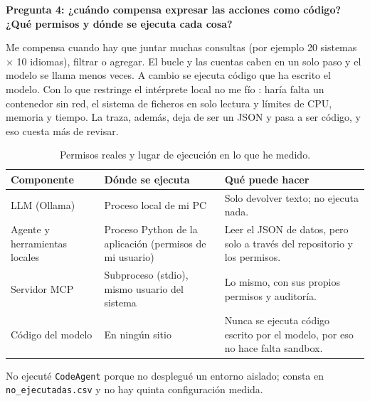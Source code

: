 \documentclass[10pt,a4paper]{article}
\newcommand{\cod}[1]{\texttt{\small #1}}
\newcommand{\pregunta}[1]{\par\medskip\noindent\colorbox{azul!10}{\parbox{\dimexpr\linewidth-2\fboxsep}{\textbf{#1}}}\par\smallskip}
\begin{document}
\pregunta{Pregunta 4: ¿cuándo compensa expresar las acciones como código? ¿Qué permisos y dónde se ejecuta cada cosa?}
Me compensa cuando hay que juntar muchas consultas (por ejemplo 20 sistemas $\times$ 10 idiomas), filtrar o agregar. El bucle y las cuentas caben en un solo paso y el modelo se llama menos veces.
A cambio se ejecuta código que ha escrito el modelo. Con lo que restringe el intérprete local no me fío \cite{smolsec}: haría falta un contenedor sin red, el sistema de ficheros en solo lectura y límites de CPU, memoria y tiempo. La traza, además, deja de ser un JSON y pasa a ser código, y eso cuesta más de revisar.

\begin{table}[h]\centering\small
\begin{tabularx}{\linewidth}{@{}l>{\raggedright\arraybackslash}X>{\raggedright\arraybackslash}X@{}}\toprule
Componente & Dónde se ejecuta & Qué puede hacer\\\midrule
LLM (Ollama) & Proceso local de mi PC & Solo devolver texto; no ejecuta nada.\\
Agente y herramientas locales & Proceso Python de la aplicación (permisos de mi usuario) & Leer el JSON de datos, pero solo a través del repositorio y los permisos.\\
Servidor MCP & Subproceso (stdio), mismo usuario del sistema & Lo mismo, con sus propios permisos y auditoría.\\
Código del modelo & En ningún sitio & Nunca se ejecuta código escrito por el modelo, por eso no hace falta sandbox.\\\bottomrule
\end{tabularx}
\caption{Permisos reales y lugar de ejecución en lo que he medido.}
\end{table}
No ejecuté \cod{CodeAgent} porque no desplegué un entorno aislado; consta en \cod{no\_ejecutadas.csv} y no hay quinta configuración medida.
\end{document}
